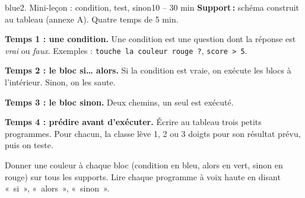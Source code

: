\documentclass[11pt,a4paper]{article}
\begin{document}
\begin{etape}{blue}{2. Mini-leçon : condition, test, sinon}{10 -- 30 min}
\textbf{Support\,:} schéma construit au tableau (annexe A). Quatre temps de 5 min.

\textbf{Temps 1 : une condition.} Une condition est une question dont la réponse est \emph{vrai} ou \emph{faux}. Exemples : \texttt{touche la couleur rouge ?}, \texttt{score > 5}.

\textbf{Temps 2 : le bloc si\ldots{} alors.} Si la condition est vraie, on exécute les blocs à l'intérieur. Sinon, on les saute.

\textbf{Temps 3 : le bloc sinon.} Deux chemins, un seul est exécuté.

\begin{center}
\end{center}

\textbf{Temps 4 : prédire avant d'exécuter.} Écrire au tableau trois petits programmes. Pour chacun, la classe lève 1, 2 ou 3 doigts pour son résultat prévu, puis on teste.

\begin{astuce}
Donner une couleur à chaque bloc (condition en bleu, alors en vert, sinon en rouge) sur tous les supports. Lire chaque programme à voix haute en disant «~si~», «~alors~», «~sinon~».
\end{astuce}
\end{etape}
\end{document}
